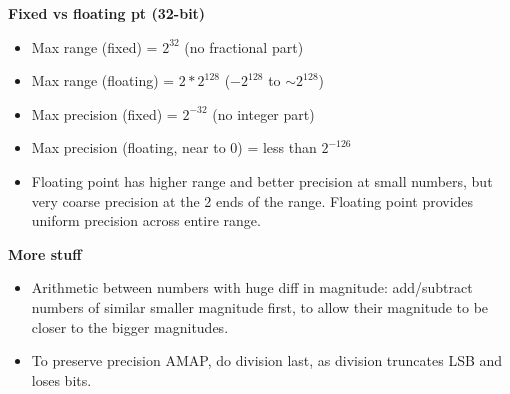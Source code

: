 \documentclass[10pt]{article}
\begin{document}
\textbf{Fixed vs floating pt (32-bit)}
\begin{itemize}
    \item Max range (fixed) = $2^{32}$ (no fractional part)
    \item Max range (floating) = $2*2^{128}$ ($-2^{128}$ to $\sim 2^{128}$)
    \item Max precision (fixed) = $2^{-32}$ (no integer part)
    \item Max precision (floating, near to 0) = less than $2^{-126}$
    \item Floating point has higher range and better precision at small numbers, but very coarse precision at the 2 ends of the range. Floating point provides uniform precision across entire range.
\end{itemize}
\textbf{More stuff}
\begin{itemize}
    \item Arithmetic between numbers with huge diff in magnitude: add/subtract numbers of similar smaller magnitude first, to allow their magnitude to be closer to the bigger magnitudes.
    \item To preserve precision AMAP, do division last, as division truncates LSB and loses bits.
\end{itemize}
\end{document}
